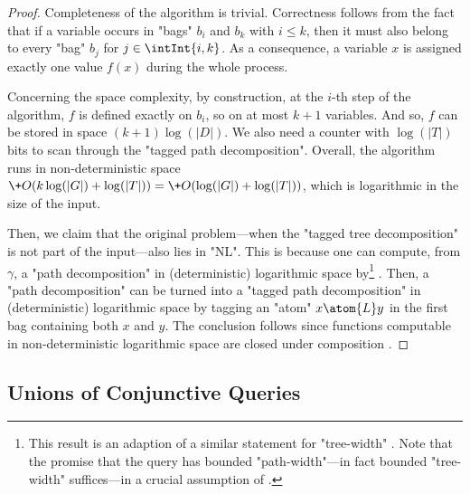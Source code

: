 \begin{proof}
	Completeness of the algorithm is trivial. Correctness follows from the fact that if
	a variable occurs in "bags" $b_i$ and $b_k$ with $i \leq k$, then it must also belong to every
	"bag" $b_j$ for $j \in \intInt{i,k}$. As a consequence, a variable $x$ is assigned 
	exactly one value $f(x)$ during the whole process. 

	Concerning the space complexity,
	by construction, at the $i$-th step of the algorithm, $f$ is defined exactly on $b_i$, so on at most $k+1$ variables.
	And so, $f$ can be stored in space $(k+1)\log(|D|)$.
	We also need a counter with $\log(|T|)$ bits to scan through the "tagged path decomposition".
	Overall, the algorithm runs in non-deterministic space
	$\+O(k\log(|G|) + \log(|T|)) = \+O(\log(|G|) + \log(|T|))$,
	which is logarithmic in the size of the input.

	Then, we claim that the original problem---when the "tagged tree decomposition" is not part of 
	the input---also lies in "NL". This is because one can compute, from $\gamma$, a
	"path decomposition" in (deterministic) logarithmic space by\footnote{This result is an 
	adaption of a similar statement for "tree-width" \cite[Theorem I.1, p. 143]{ElberfeldJakobyTantau2010Logspace}. Note that the promise that the query has bounded "path-width"---in fact bounded "tree-width" suffices---in a crucial assumption of  \cite[Theorem I.1, p. 143]{ElberfeldJakobyTantau2010Logspace}.} 
	\cite[Theorem 1.3, p. 2]{KintaliMunteanu2010Computing}. Then, a "path decomposition" can be turned into a 
	"tagged path decomposition" in (deterministic) logarithmic space by tagging an "atom"
	$x \atom{L} y$ in the first bag containing both $x$ and $y$.
	The conclusion follows since functions computable in non-deterministic logarithmic space
	are closed under composition \cite[Lemma 4.17, p. 88]{AroraBarak2009ComputationalComplexity}. 
\end{proof}

\subsection{Unions of Conjunctive Queries}
\label{sec:prelim-db-ucq}

